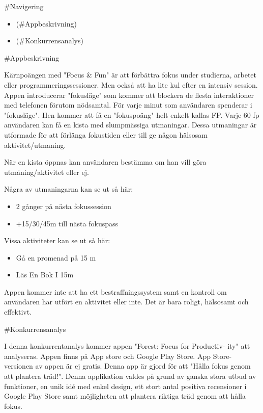 \documentclass[11pt]{article}
\author{Nadim}
\date{\today}
\title{}
\begin{document}
\tableofcontents

\#Navigering
\begin{itemize}
\item\relax [Appbeskrivning](\#Appbeskrivning)
\item\relax [Konkurrensanalys](\#Konkurrensanalys)
\end{itemize}

\#Appbeskrivning

Kärnpoängen med "Focus \& Fun" är att förbättra fokus under studierna,
arbetet eller programmeringssessioner. Men också att ha lite kul efter
en intensiv session. Appen introducerar "fokusläge" som kommer att
blockera de flesta interaktioner med telefonen förutom nödsamtal. För
varje minut som användaren spenderar i "fokusläge". Hen kommer att få
en "fokuspoäng" helt enkelt kallas FP. Varje 60 fp användaren kan få
en kista med slumpmässiga utmaningar. Dessa utmaningar är utformade
för att förlänga fokustiden eller till ge någon hälsosam
aktivitet/utmaning.

När en kista öppnas kan användaren bestämma om han vill göra
utmåning/aktivitet eller ej.

Några av utmaningarna kan se ut så här:
\begin{itemize}
\item 2 gånger på nästa fokussession
\item +15/30/45m till nästa fokuspass
\end{itemize}

Vissa aktiviteter kan se ut så här:

\begin{itemize}
\item Gå en promenad på 15 m
\item Läs En Bok I 15m
\end{itemize}

Appen kommer inte att ha ett bestraffningssystem samt en kontroll om
användaren har utfört en aktivitet eller inte. Det är bara roligt,
hälsosamt och effektivt.

\#Konkurrensanalys

I denna konkurrentanalys kommer appen "Forest: Focus for Productiv-
ity" att analyseras. Appen finns på App store och Google Play Store. App
Store-versionen av appen är ej gratis. Denna app är gjord för att "Hålla
fokus genom att plantera träd!".
Denna applikation valdes på grund av ganska stora utbud av funktioner,
en unik idé med enkel design, ett stort antal positiva recensioner i Google
Play Store samt möjligheten att plantera riktiga träd genom att hålla fokus.
\end{document}

